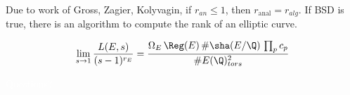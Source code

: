 \begin{frame}[plain]
\pause

Due to work of Gross, Zagier, Kolyvagin, if $r_{an} \leq 1$, then $r_{\text{anal}}=r_{alg}$.
If BSD is true, there is an algorithm to compute the rank of an elliptic curve. \pause

	\[
	\lim_{s \to 1} \dfrac{L(E,s)}{(s-1)^{r_E}} = \dfrac{\Omega_E \, \Reg(E) \, \#\sha(E/\Q) \, \prod_p c_p}{\#E(\Q)_{tors}^2}
	\]
\end{frame}



\begingroup
{}
\begin{frame}[plain]
\phantom{x} \vfill
\begin{center} {\huge \textcolor{white}{Questions?}} \end{center}
\vfill
\end{frame}
\endgroup